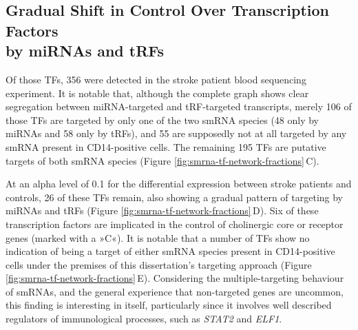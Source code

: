 \subsection{Gradual Shift in Control Over Transcription Factors\\ by miRNAs and tRFs}
Of those TFs, 356 were detected in the stroke patient blood sequencing experiment. It is notable that, although the complete graph shows clear segregation between miRNA-targeted and tRF-targeted transcripts, merely 106 of those TFs are targeted by only one of the two smRNA species (48 only by miRNAs and 58 only by tRFs), and 55 are supposedly not at all targeted by any smRNA present in CD14-positive cells. The remaining 195 TFs are putative targets of both smRNA species (Figure \ref{fig:smrna-tf-network-fractions}\,C). 

At an alpha level of 0.1 for the differential expression between stroke patients and controls, 26 of these TFs remain, also showing a gradual pattern of targeting by miRNAs and tRFs (Figure \ref{fig:smrna-tf-network-fractions}\,D). Six of these transcription factors are implicated in the control of cholinergic core or receptor genes (marked with a »C«). It is notable that a number of TFs show no indication of being a target of either smRNA species present in CD14-positive cells under the premises of this dissertation's targeting approach (Figure \ref{fig:smrna-tf-network-fractions}\,E). Considering the multiple-targeting behaviour of smRNAs, and the general experience that non-targeted genes are uncommon, this finding is interesting in itself, particularly since it involves well described regulators of immunological processes, such as \emph{STAT2} and \emph{ELF1}.

